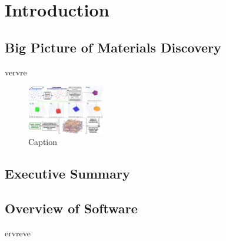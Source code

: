 \chapter{Introduction} \label{sec:Introduction}

\section{Big Picture of Materials Discovery}
vervre

\begin{figure}[h]
    \centering
    \includegraphics[width=0.3\textwidth]{pysipfenn/KS2022.png}
    \caption{Caption}
    \label{fig:graphicalabstract}
\end{figure}

\cite{Krajewski2024Nimplex}

\section{Executive Summary}

\section{Overview of Software}

ervreve

\printbibliography[heading=subbibintoc]